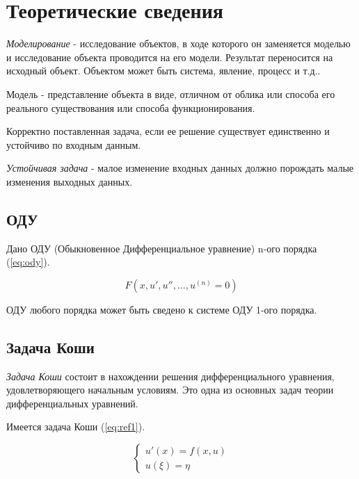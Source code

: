 

\chapter{Теоретические сведения}

\textit{Моделирование} - исследование объектов, в ходе которого он заменяется моделью и исследование объекта проводится на его модели.
Результат переносится на исходный объект. 
Объектом может быть система, явление, процесс и т.д..

Модель -  представление объекта в виде, отличном от облика или способа его реального существования
или способа функционирования.

Корректно поставленная задача, если ее решение существует единственно и устойчиво по входным данным.

\textit{Устойчивая задача} - малое изменение входных данных должно порождать малые изменения выходных данных.

\section{ОДУ}

Дано ОДУ (Обыкновенное Дифференциальное уравнение) n-ого порядка (\ref{eq:ody}).

\begin{equation}
	F(x, u', u'', ... , u^{(n)} = 0)
	\label{eq:ody}
\end{equation}

ОДУ любого порядка может быть сведено к системе ОДУ 1-ого порядка.

\section{Задача Коши}

\textit{Задача Коши} состоит в нахождении решения дифференциального уравнения, удовлетворяющего начальным условиям. 
Это одна из основных задач теории дифференциальных уравнений.

Имеется задача Коши (\ref{eq:ref1}).

\begin{equation}
	{\begin{cases}
			u'(x) = f(x,u) \\
			u(\xi) = \eta
		\end{cases}}
		\label{eq:ref1}
\end{equation}

